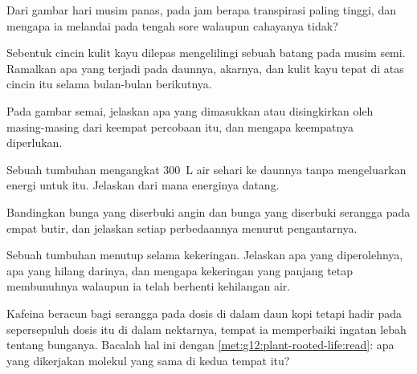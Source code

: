 \begin{exercise}[$\star\star$]\label{exo:g12:plant-rooted-life:7}
Dari gambar hari musim panas, pada jam berapa transpirasi paling
tinggi, dan mengapa ia melandai pada tengah sore walaupun cahayanya
tidak?
\end{exercise}

\begin{exercise}[$\star\star$]\label{exo:g12:plant-rooted-life:8}
Sebentuk cincin kulit kayu dilepas mengelilingi sebuah batang pada
musim semi. Ramalkan apa yang terjadi pada daunnya, akarnya, dan kulit
kayu tepat di atas cincin itu selama bulan-bulan berikutnya.
\end{exercise}

\begin{exercise}[$\star\star$]\label{exo:g12:plant-rooted-life:9}
Pada gambar semai, jelaskan apa yang dimasukkan atau disingkirkan oleh
masing-masing dari keempat percobaan itu, dan mengapa keempatnya
diperlukan.
\end{exercise}

\begin{exercise}[$\star\star$]\label{exo:g12:plant-rooted-life:10}
Sebuah tumbuhan mengangkat \qty{300}{L} air sehari ke daunnya tanpa
mengeluarkan energi untuk itu. Jelaskan dari mana energinya datang.
\end{exercise}

\begin{exercise}[$\star\star$]\label{exo:g12:plant-rooted-life:11}
Bandingkan bunga yang diserbuki angin dan bunga yang diserbuki
serangga pada empat butir, dan jelaskan setiap perbedaannya menurut
pengantarnya.
\end{exercise}

\begin{exercise}[$\star\star\star$]\label{exo:g12:plant-rooted-life:12}
Sebuah tumbuhan menutup  selama kekeringan. Jelaskan apa yang
diperolehnya, apa yang hilang darinya, dan mengapa kekeringan yang
panjang tetap membunuhnya walaupun ia telah berhenti kehilangan air.
\end{exercise}

\begin{exercise}[$\star\star\star$]\label{exo:g12:plant-rooted-life:13}
Kafeina beracun bagi serangga pada dosis di dalam daun kopi tetapi
hadir pada sepersepuluh dosis itu di dalam nektarnya, tempat ia
memperbaiki ingatan lebah tentang bunganya. Bacalah hal ini dengan
\cref{met:g12:plant-rooted-life:read}: apa yang dikerjakan molekul yang
sama di kedua tempat itu?
\end{exercise}

